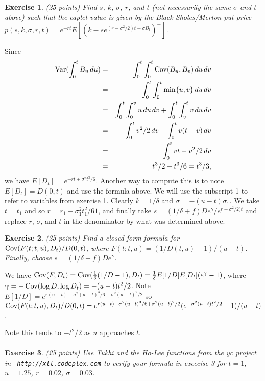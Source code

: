 \documentclass[11pt,fleqn]{amsproc}
\newcommand{\Var}{\mathop{\rm{Var}}}
\newcommand{\Cov}{\mathop{\rm{Cov}}}
\newtheorem{xca}{Exercise}
\begin{document}
\begin{xca}{(25 points)}
Find $s$, $k$, $\sigma$,  $r$, and $t$ (not necessarily the same $\sigma$ and
$t$ above) such that the caplet value is given by the Black-Sholes/Merton
put price $p(s, k, \sigma, r, t) = e^{-rt}E[(k - se^{(r - \sigma^2/2)t +
\sigma B_t})^+]$.

\end{xca}
Since 
\begin{eqnarray*}
\Var(\int_0^t B_u\,du)
&=& \int_0^t\int_0^t \Cov(B_u, B_v)\,du\,dv\\
&=& \int_0^t\int_0^t \min\{u,v\}\,du\,dv\\
&=& \int_0^t\int_0^v u\,du\,dv + \int_0^t\int_v^t v\,du\,dv\\
&=& \int_0^t v^2/2\,dv + \int_0^t v(t - v)\,dv\\
&=& \int_0^t vt - v^2/2\,dv\\
&=& t^3/2 - t^3/6 = t^3/3,\\
\end{eqnarray*}
we have $E[D_t] = e^{-rt + \sigma^2t^3/6}$. Another way to 
compute this is to note $E[D_t] = D(0, t)$ and use the
formula above.
We will use the subscript 1 to refer to variables from exercise 1.
Clearly $k = 1/\delta$ and $\sigma = -(u - t)\sigma_1$. We take
$t = t_1$ and so $r = r_1 - \sigma_1^2t_1^2/61$, and finally
take $s = (1/\delta + f)De^\gamma/e^{r - \sigma^2/2)t}$ and
replace $r$, $\sigma$, and $t$ in the denominator by
what was determined above.

\begin{xca}{(25 points)}
Find a closed form formula for $\Cov(F(t;t,u), D_t)/D(0,t)$, where $F(t;t,
u) = (1/D(t, u) - 1)/(u - t)$. Finally, choose $s
= (1/\delta + f)De^\gamma$.

\end{xca}

We have $\Cov(F, D_t) = \Cov(\frac{1}{\delta}(1/D - 1), D_t)
= \frac{1}{\delta}E[1/D]E[D_t](e^\gamma - 1)$, where $\gamma
= -\Cov(\log D, \log D_t) = -(u - t)t^2/2$.
Note $E[1/D] = e^{r(u - t) - \sigma^2(u - t)^3/6 + \sigma^2(u - t)^2/2}$
so $\Cov(F(t;t,u), D_t)/D(0,t)= e^{r(u - t)
- \sigma^2(u - t)^3/6 + \sigma^2(u - t)^2/2}(e^{-\sigma^2(u - t)t^2/2} - 1)/(u - t)$.

Note this tends to $-t^2/2$ as $u$ approaches $t$.
\begin{eqnarray*}
\end{eqnarray*}

\begin{xca}{(25 points)}
Use Tukhi and the Ho-Lee functions from the yc project in {\tt
http://xll.codeplex.com} to verify your formula in excecise 3 for $t =
1$, $u = 1.25$, $r = 0.02$, $\sigma = 0.03$.

\end{xca}
\end{document}
